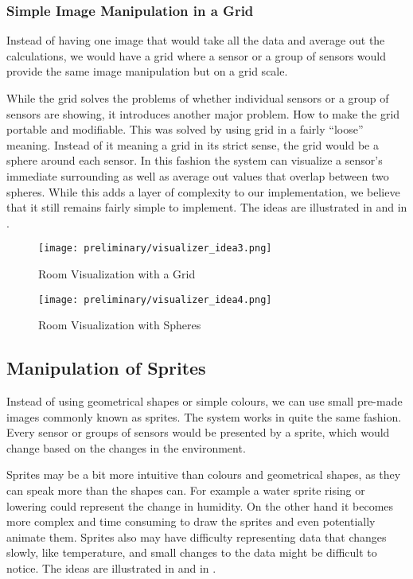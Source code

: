 \documentclass[../document]{subfiles}
\begin{document}
\subsubsection{Simple Image Manipulation in a Grid}
Instead of having one image that would take all the data and average out the calculations, we would have a grid where a sensor or a group of sensors would provide the same image manipulation but on a grid scale.

While the grid solves the problems of whether individual sensors or a group of sensors are showing, it introduces another major problem. How to make the grid portable and modifiable. This was solved by using grid in a fairly “loose” meaning. Instead of it meaning a grid in its strict sense, the grid would be a sphere around each sensor. In this fashion the system can visualize a sensor’s immediate surrounding as well as average out values that overlap between two spheres. While this adds a layer of complexity to our implementation, we believe that it still remains fairly simple to implement. The ideas are illustrated in   and in .

\begin{figure}
	\texttt{[image: preliminary/visualizer\_idea3.png]}
	\caption{Room Visualization with a Grid}
	\label{fig:visualizer_idea3}
\end{figure}

\begin{figure}
	\texttt{[image: preliminary/visualizer\_idea4.png]}
	\caption{Room Visualization with Spheres}
	\label{fig:visualizer_idea4}
\end{figure}

\subsection{Manipulation of Sprites}
Instead of using geometrical shapes or simple colours, we can use small pre-made images commonly known as sprites. The system works in quite the same fashion. Every sensor or groups of sensors would be presented by a sprite, which would change based on the changes in the environment.

Sprites may be a bit more intuitive than colours and geometrical shapes, as they can speak more than the shapes can. For example a water sprite rising or lowering could represent the change in humidity. On the other hand it becomes more complex and time consuming to draw the sprites and even potentially animate them. Sprites also may have difficulty representing data that changes slowly, like temperature, and small changes to the data might be difficult to notice. The ideas are illustrated in   and in .
\end{document}

